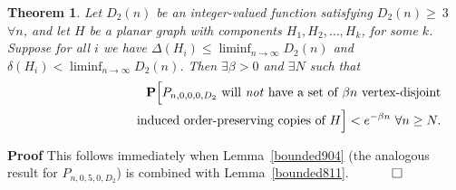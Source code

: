 \documentclass{article}
\newtheorem{Theorem}{Theorem}
\newtheorem{Proof of Theorem}{Proof of Theorem}
\begin{document}
\begin{Theorem} \label{bounded802}
Let $D_{2}(n)$ be an integer-valued function satisfying $D_{2}(n) \!\geq~\!\!3$~$\forall n$,
and let $H$ be a planar graph with components $H_{1},H_{2}, \ldots, H_{k}$, for some $k$.
Suppose for all $i$ we have 
$\Delta(H_{i}) \leq \liminf_{n \to \infty} D_{2}(n)$ and $\delta(H_{i}) < \liminf_{n \to \infty} D_{2}(n)$.
Then $\exists \beta > 0$ and $\exists N$ such that
\begin{eqnarray*}
& & \mathbf{P} \Big[
\textrm{$P_{n,0,0,0,D_{2}}$
will \emph{not} have a set of $\beta n$ vertex-disjoint} \\ 
& & \phantom{wwwwwwwwww}\textrm{induced order-preserving copies of $H$}\Big] 
< e^{- \beta n}~ 
\forall n \geq N.
\end{eqnarray*}
\end{Theorem}
\textbf{Proof}
This follows immediately when Lemma~\ref{bounded904}
(the analogous result for $P_{n,0,5,0,D_{2}}$) is combined with Lemma~\ref{bounded811}.
$\phantom{qwerty}
\setlength{\unitlength}{.25cm}
\begin{picture}(1,1)
\put(0,0){\line(1,0){1}}
\put(0,0){\line(0,1){1}}
\put(1,1){\line(-1,0){1}}
\put(1,1){\line(0,-1){1}}
\end{picture}$ \\
\end{document}
